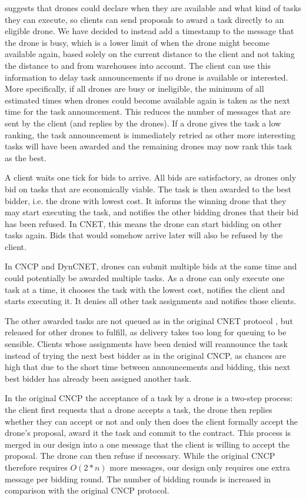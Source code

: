 \documentclass[10pt,a4paper]{article}
\newcommand{\commentV}[1]{\todo[inline, color=yellow]{Victor: #1}}
\begin{document}
\cite{CNET} suggests that drones could declare when they are available and what kind of tasks they can execute, so clients can send proposals to award a task directly to an eligible drone. We have decided to instead add a timestamp to the message that the drone is busy, which is a lower limit of when the drone might become available again, based solely on the current distance to the client and not taking the distance to and from warehouses into account. The client can use this information to delay task announcements if no drone is available or interested. More specifically, if all drones are busy or ineligible, the minimum of all estimated times when drones could become available again is taken as the next time for the task announcement. This reduces the number of messages that are sent by the client (and replies by the drones). If a drone gives the task a low ranking, the task announcement is immediately retried as other more interesting tasks will have been awarded and the remaining drones may now rank this task as the best.

A client waits one tick for bids to arrive. All bids are satisfactory, as drones only bid on tasks that are economically viable. The task is then awarded to the best bidder, i.e. the drone with lowest cost. It informs the winning drone that they may start executing the task, and notifies the other bidding drones that their bid has been refused. In CNET, this means the drone can start bidding on other tasks again. Bids that would somehow arrive later will also be refused by the client.

In CNCP and DynCNET, drones can submit multiple bids at the same time and could potentially be awarded multiple tasks. As a drone can only execute one task at a time, it chooses the task with the lowest cost, notifies the client and starts executing it. It denies all other task assignments and notifies those clients.

The other awarded tasks are not queued as in the original CNET protocol \commentV{of verwijzing naar CNET eruithalen?}, but released for other drones to fulfill, as delivery takes too long for queuing to be sensible. Clients whose assignments have been denied will reannounce the task instead of trying the next best bidder as in the original CNCP, as chances are high that due to the short time between announcements and bidding, this next best bidder has already been assigned another task. 

In the original CNCP the acceptance of a task by a drone is a two-step process: the client first requests that a drone accepts a task, the drone then replies whether they can accept or not and only then does the client formally accept the drone's proposal, award it the task and commit to the contract. This process is merged in our design into a one message that the client is willing to accept the proposal. The drone can then refuse if necessary. While the original CNCP therefore requires $O(2*n)$ more messages, our design only requires one extra message per bidding round.  The number of bidding rounds is increased in comparison with the original CNCP protocol.
\end{document}

